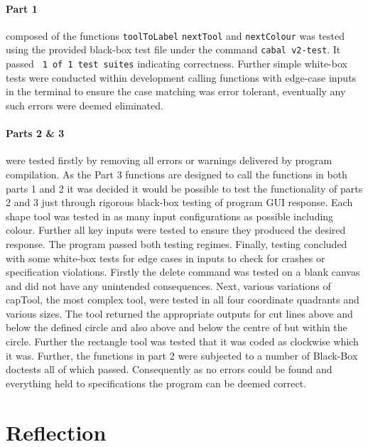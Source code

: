 \documentclass[11pt]{article}
\begin{document}
\paragraph{Part 1} 
 composed of the functions \verb|toolToLabel| \verb|nextTool| and \verb|nextColour| was tested using the provided black-box test file under the command \verb|cabal v2-test|. It passed \verb| 1 of 1 test suites| indicating correctness. Further simple white-box tests were conducted within development calling functions with edge-case inputs in the terminal to ensure the case matching was error tolerant, eventually any such errors were deemed eliminated.
 
\paragraph{Parts 2 \& 3} 
were tested firstly by removing all errors or warnings delivered by program compilation. As the Part 3 functions are designed to call the functions in both parts 1 and 2 it was decided it would be possible to test the functionality of parts 2 and 3 just through rigorous black-box testing of program GUI response. Each shape tool was tested in as many input configurations as possible including colour. Further all key inputs were tested to ensure they produced the desired response. The program passed both testing regimes. Finally, testing concluded with some white-box tests for edge cases in inputs to check for crashes or specification violations. Firstly the delete command was tested on a blank canvas and did not have any unintended consequences. Next, various variations of capTool, the most complex tool, were tested in all four coordinate quadrants and various sizes. The tool returned the appropriate outputs for cut lines above and below the defined circle and also above and below the centre of but within the circle. Further the rectangle tool was tested that it was coded as clockwise which it was. Further, the functions in part 2 were subjected to a number of Black-Box doctests all of which passed. Consequently as no errors could be found and everything held to specifications the program can be deemed correct.
\section{Reflection}
\end{document}
